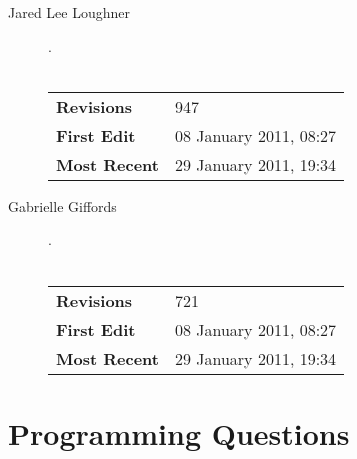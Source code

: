 \documentclass[a4paper,11pt,oneside]{book}
\begin{document}
\begin{enumerate}
\begin{description}
		\item [Jared Lee Loughner].\\\\
			\begin{tabular}{| l || l | } \hline
			  {\bf Revisions} & 947 \\
			  {\bf First Edit} & 08 January 2011, 08:27 \\
			  {\bf Most Recent} & 29 January 2011, 19:34  \\	\hline
			\end{tabular}
		\item [Gabrielle Giffords]. \\\\
			\begin{tabular}{| l || l | } \hline
			  {\bf Revisions} & 721 \\
			  {\bf First Edit} & 08 January 2011, 08:27 \\
			  {\bf Most Recent} & 29 January 2011, 19:34  \\	\hline
			\end{tabular}
		\end{description}
 \end {enumerate}

\chapter{Programming Questions}





\end{document}

